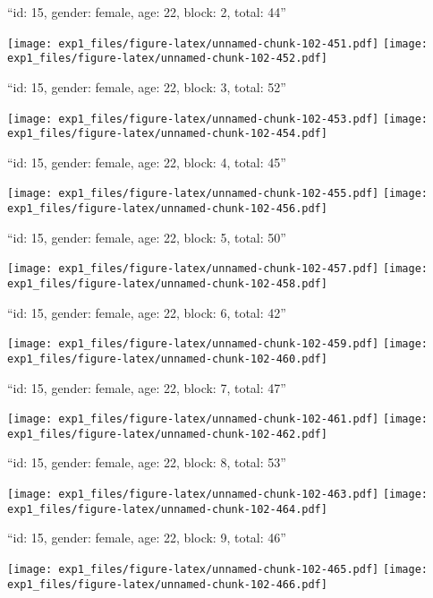 \documentclass[11pt,,]{article}
\begin{document}
\newpage
[1] 

``id: 15, gender: female, age: 22, block: 2, total: 44''

\texttt{[image: exp1\_files/figure-latex/unnamed-chunk-102-451.pdf]}
\texttt{[image: exp1\_files/figure-latex/unnamed-chunk-102-452.pdf]}

\newpage
[1] 

``id: 15, gender: female, age: 22, block: 3, total: 52''

\texttt{[image: exp1\_files/figure-latex/unnamed-chunk-102-453.pdf]}
\texttt{[image: exp1\_files/figure-latex/unnamed-chunk-102-454.pdf]}

\newpage
[1] 

``id: 15, gender: female, age: 22, block: 4, total: 45''

\texttt{[image: exp1\_files/figure-latex/unnamed-chunk-102-455.pdf]}
\texttt{[image: exp1\_files/figure-latex/unnamed-chunk-102-456.pdf]}

\newpage
[1] 

``id: 15, gender: female, age: 22, block: 5, total: 50''

\texttt{[image: exp1\_files/figure-latex/unnamed-chunk-102-457.pdf]}
\texttt{[image: exp1\_files/figure-latex/unnamed-chunk-102-458.pdf]}

\newpage
[1] 

``id: 15, gender: female, age: 22, block: 6, total: 42''

\texttt{[image: exp1\_files/figure-latex/unnamed-chunk-102-459.pdf]}
\texttt{[image: exp1\_files/figure-latex/unnamed-chunk-102-460.pdf]}

\newpage
[1] 

``id: 15, gender: female, age: 22, block: 7, total: 47''

\texttt{[image: exp1\_files/figure-latex/unnamed-chunk-102-461.pdf]}
\texttt{[image: exp1\_files/figure-latex/unnamed-chunk-102-462.pdf]}

\newpage
[1] 

``id: 15, gender: female, age: 22, block: 8, total: 53''

\texttt{[image: exp1\_files/figure-latex/unnamed-chunk-102-463.pdf]}
\texttt{[image: exp1\_files/figure-latex/unnamed-chunk-102-464.pdf]}

\newpage
[1] 

``id: 15, gender: female, age: 22, block: 9, total: 46''

\texttt{[image: exp1\_files/figure-latex/unnamed-chunk-102-465.pdf]}
\texttt{[image: exp1\_files/figure-latex/unnamed-chunk-102-466.pdf]}
\end{document}
